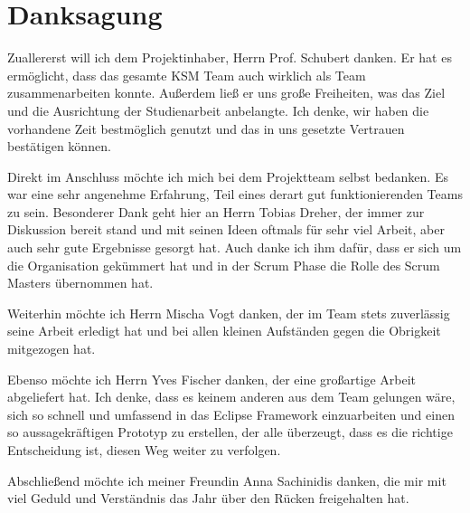 \section*{Danksagung}

Zuallererst will ich dem Projektinhaber, Herrn Prof. Schubert danken. Er hat es ermöglicht, dass das gesamte KSM Team auch wirklich als Team zusammenarbeiten konnte. Außerdem ließ er uns große Freiheiten, was das Ziel und die Ausrichtung der Studienarbeit anbelangte. Ich denke, wir haben die vorhandene Zeit bestmöglich genutzt und das in uns gesetzte Vertrauen bestätigen können. 

Direkt im Anschluss möchte ich mich bei dem Projektteam selbst bedanken. Es war eine sehr angenehme Erfahrung, Teil eines derart gut funktionierenden Teams zu sein. Besonderer Dank geht hier an Herrn Tobias Dreher, der immer zur Diskussion bereit stand und mit seinen Ideen oftmals für sehr viel Arbeit, aber auch sehr gute Ergebnisse gesorgt hat. Auch danke ich ihm dafür, dass er sich um die Organisation gekümmert hat und in der Scrum Phase die Rolle des Scrum Masters übernommen hat.

Weiterhin möchte ich Herrn Mischa Vogt danken, der im Team stets zuverlässig seine Arbeit erledigt hat und bei allen kleinen Aufständen gegen die Obrigkeit mitgezogen hat.

Ebenso möchte ich Herrn Yves Fischer danken, der eine großartige Arbeit abgeliefert hat. Ich denke, dass es keinem anderen aus dem Team gelungen wäre, sich so schnell und umfassend in das Eclipse Framework einzuarbeiten und einen so aussagekräftigen Prototyp zu erstellen, der alle überzeugt, dass es die richtige Entscheidung ist, diesen Weg weiter zu verfolgen.

Abschließend möchte ich meiner Freundin Anna Sachinidis danken, die mir mit viel Geduld und Verständnis das Jahr über den Rücken freigehalten hat.